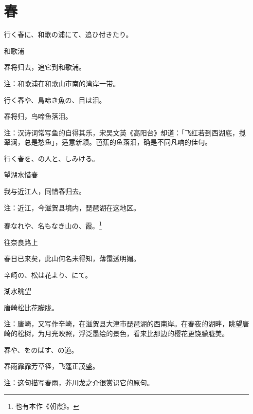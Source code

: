 \section{\FK 春}

\setcounter{haikucounter}{0}

\begin{haiku}
    {\FH 行く春に、和歌の浦にて、追ひ付きたり。}

    {\FK 和歌浦}

    {\FK 春将归去，追它到和歌浦。}

    {\FT 注：和歌浦在和歌山市南的湾岸一带。}
\end{haiku}

\begin{haiku}
    {\FH 行く春や、鳥啼き魚の、目は泪。}

    {\FK 春将归，鸟啼鱼落泪。}

    {\FT 注：汉诗词常写鱼的自得其乐，宋吴文英《高阳台》却道：「飞红若到西湖底，搅翠澜，总是愁鱼」，适意新颖。芭蕉的鱼落泪，确是不同凡响的佳句。}
\end{haiku}

\begin{haiku}
    {\FH 行く春を、の人と、しみける。}

    {\FK 望湖水惜春}

    {\FK 我与近江人，同惜春归去。}

    {\FT 注：近江，今滋贺县境内，琵琶湖在这地区。}
\end{haiku}

\begin{haiku}
    {\FH 春なれや、名もなき山の、霞。\footnote{\FT 也有本作《朝霞》。}}

    {\FK 往奈良路上}

    {\FK 春日已来矣，此山何名未得知，薄霭透明媚。}
\end{haiku}

\begin{haiku}
    {\FH 辛崎の、松は花より、にて。}

    {\FK 湖水眺望}

    {\FK 唐崎松比花朦胧。}

    {\FT 注：唐崎，又写作辛崎，在滋贺县大津市琵琶湖的西南岸。在春夜的湖畔，眺望唐崎的松树，为月光映照，浮泛墨绘的景色，看来比那边的樱花更饶朦胧美。}
\end{haiku}

\begin{haiku}
    {\FH 春や、をのばす、の道。}

    {\FK 春雨霏霏芳草径，飞蓬正茂盛。}

    {\FT 注：这句描写春雨，芥川龙之介很赏识它的原句。}
\end{haiku}

